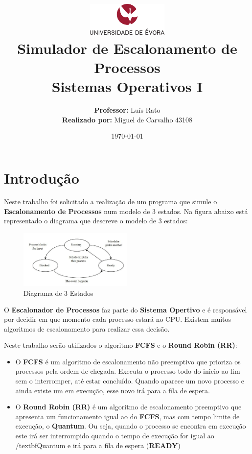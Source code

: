 \documentclass[11pt]{article}   %
\title
{
    \includegraphics[width=0.3\textwidth]{images/logo_universidade.png}
    \\[0.1cm]
    \textbf{Simulador de Escalonamento de Processos} \\
    Sistemas Operativos I
}
\author
{
    \textbf{Professor:} Luís Rato \\
    \textbf{Realizado por:} Miguel de Carvalho 43108 
}
\date{\today}
\begin{document}
\maketitle

\section{Introdução} 

\hspace{0,5cm}Neste trabalho foi solicitado a realização de um programa que simule o \textbf{Escalonamento de Processos} num modelo de 3 estados. Na figura abaixo está representado o diagrama que descreve o modelo de 3 estados:\par
\begin{figure}[h!]
    \begin{center}
        \includegraphics[width=0.5\textwidth]{images/states.png}
        \caption{Diagrama de 3 Estados}
    \end{center}
\end{figure}
O \textbf{Escalonador de Processos} faz parte do \textbf{Sistema Opertivo} e é responsável por decidir em que momento cada processo estará no CPU. 
Existem muitos algoritmos de escalonamento para realizar essa decisão. \par
Neste trabalho serão utilizados o algoritmo \textbf{FCFS} e o \textbf{Round Robin (RR)}:
\begin{itemize}
    \item O \textbf{FCFS} é um algoritmo de escalonamento não preemptivo que prioriza os processos pela ordem de chegada. Executa o processo todo do inicio ao fim sem o interromper, até estar concluído. Quando aparece um novo processo e ainda existe um em execução, esse novo irá para a fila de espera.
    \item O \textbf{Round Robin (RR)} é um algoritmo de escalonamento preemptivo que apresenta um funcionamento igual ao do \textbf{FCFS}, mas com tempo limite de execução, o \textbf{Quantum}. Ou seja, quando o processo se encontra em execução este irá ser interrompido quando o tempo de execução for igual ao /textbf{Quantum} e irá para a fila de espera (\textbf{READY}) 
\end{itemize}
\end{document}

